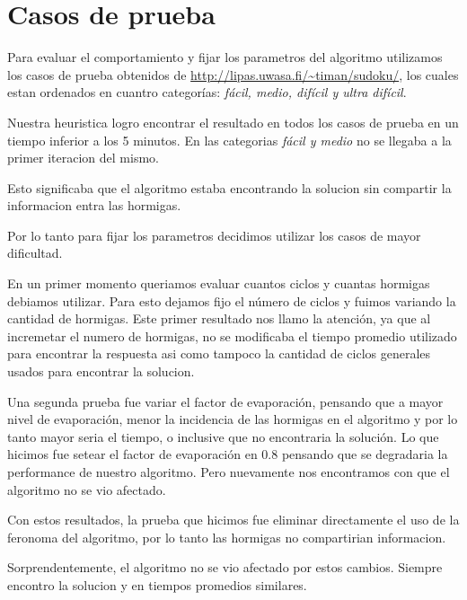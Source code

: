 \section{Casos de prueba}
\label{sec:intro}

Para evaluar el comportamiento y fijar los parametros del algoritmo utilizamos los casos de prueba obtenidos de
\url{http://lipas.uwasa.fi/~timan/sudoku/}, los cuales estan ordenados en cuantro categorías: \textit{fácil, medio, difícil y ultra difícil}.

Nuestra heuristica logro encontrar el resultado en todos los casos de prueba en 
un tiempo inferior a los 5 minutos. En las categorias  \textit{fácil y medio} no 
se llegaba a la primer iteracion del mismo.

Esto significaba que el algoritmo estaba encontrando la solucion sin compartir 
la informacion entra las hormigas. 

Por lo tanto para fijar los parametros decidimos utilizar los casos de mayor dificultad. 

En un primer momento queriamos evaluar cuantos ciclos y cuantas hormigas debiamos utilizar. 
Para esto dejamos fijo el número de ciclos y fuimos variando la cantidad de hormigas. 
Este primer resultado nos llamo la atención, ya que al incremetar el numero de hormigas, no se modificaba el tiempo 
promedio utilizado para encontrar la respuesta asi como tampoco la cantidad de 
ciclos generales usados para encontrar la solucion.



Una segunda prueba fue variar el factor de evaporación, pensando que a mayor nivel de evaporación, 
menor la incidencia de las hormigas en el algoritmo y por lo tanto mayor seria el tiempo, o inclusive que no 
encontraria la solución.
Lo que hicimos fue setear el factor de evaporación en $0.8$ pensando que se 
degradaria la performance de nuestro algoritmo. Pero nuevamente nos encontramos 
con que el algoritmo no se vio afectado.


Con estos resultados, la prueba que hicimos fue eliminar directamente el uso de 
la feronoma del algoritmo, por lo tanto las hormigas no compartirian 
informacion. 


Sorprendentemente, el algoritmo no se vio afectado por estos cambios. Siempre 
encontro la solucion y en tiempos promedios similares.


















